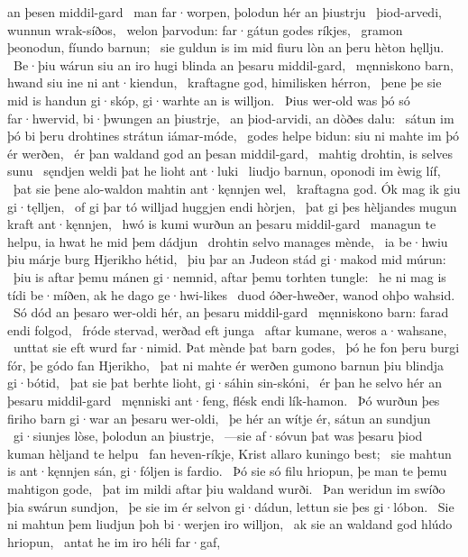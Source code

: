 an þesen middil-gard \hld\ man far·worpen,
þolodun hér an þiustrju \hld\ þiod-arvedi,
wunnun wrak-síðos, \hld\ welon þarvodun:
far·gátun godes ríkjes, \hld\ gramon þeonodun,
fíundo barnun; \hld\ sie guldun is im mid fiuru lòn
an þeru hèton hęllju. \hld\ Be·þiu wárun siu an iro hugi blinda
an þesaru middil-gard, \hld\ męnniskono barn,
hwand siu ine ni ant·kiendun, \hld\ kraftagne god,
himilisken hérron, \hld\ þene þe sie mid is handun gi·skóp,
gi·warhte an is willjon. \hld\ Þius wer-old was þó só far·hwervid,
bi·þwungen an þiustrje, \hld\ an þiod-arvidi,
an dòðes dalu: \hld\ sátun im þó bi þeru drohtines strátun
iámar-móde, \hld\ godes helpe bidun:
siu ni mahte im þó ér werðen, \hld\ ér þan waldand god
an þesan middil-gard, \hld\ mahtig drohtin,
is selves sunu \hld\ sęndjen weldi
þat he lioht ant·luki \hld\ liudjo barnun,
oponodi im èwig líf, \hld\ þat sie þene alo-waldon
mahtin ant·kęnnjen wel, \hld\ kraftagna god.
Ók mag ik giu gi·tęlljen, \hld\ of gi þar tó willjad
huggjen endi hòrjen, \hld\ þat gi þes hèljandes mugun
kraft ant·kęnnjen, \hld\ hwó is kumi wurðun
an þesaru middil-gard \hld\ managun te helpu,
ia hwat he mid þem dádjun \hld\ drohtin selvo
manages mènde, \hld\ ia be·hwiu þiu márje burg
Hjerikho hétid, \hld\ þiu þar an Judeon stád
gi·makod mid múrun: \hld\ þiu is aftar þemu mánen gi·nemnid,
aftar þemu torhten tungle: \hld\ he ni mag is tídi be·míðen,
ak he dago ge·hwi-likes \hld\ duod óðer-hweðer,
wanod ohþo wahsid. \hld\ Só dód an þesaro wer-oldi hér,
an þesaru middil-gard \hld\ męnniskono barn:
farad endi folgod, \hld\ fróde stervad,
werðad eft junga \hld\ aftar kumane,
weros a·wahsane, \hld\ unttat sie eft wurd far·nimid.
Þat mènde þat barn godes, \hld\ þó he fon þeru burgi fór,
þe gódo fan Hjerikho, \hld\ þat ni mahte ér werðen gumono barnun
þiu blindja gi·bótid, \hld\ þat sie þat berhte lioht,
gi·sáhin sin-skóni, \hld\ ér þan he selvo hér
an þesaru middil-gard \hld\ męnniski ant·feng,
flésk endi lík-hamon. \hld\ Þó wurðun þes firiho barn
gi·war an þesaru wer-oldi, \hld\ þe hér an wítje ér,
sátun an sundjun \hld\ gi·siunjes lòse,
þolodun an þiustrje, \hld\ —sie af·sóvun þat was þesaru þiod kuman
hèljand te helpu \hld\ fan heven-ríkje,
Krist allaro kuningo best; \hld\ sie mahtun is ant·kęnnjen sán,
gi·fóljen is fardio. \hld\ Þó sie só filu hriopun, %
þe man te þemu mahtigon gode, \hld\ þat im mildi aftar þiu
waldand wurði. \hld\ Þan weridun im swíðo
þia swárun sundjon, \hld\ þe sie im ér selvon gi·dádun,
lettun sie þes gi·lóbon. \hld\ Sie ni mahtun þem liudjun þoh
bi·werjen iro willjon, \hld\ ak sie an waldand god
hlúdo hriopun, \hld\ antat he im iro héli far·gaf,
